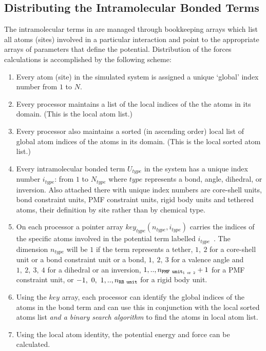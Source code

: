 \subsection{Distributing the Intramolecular Bonded Terms}

The intramolecular
terms in \D are managed through bookkeeping arrays which
list all atoms (sites) involved in a particular interaction
and point to the appropriate arrays of parameters that define
the potential.  Distribution of the forces calculations
is accomplished by the following scheme:
\begin{enumerate}
\item Every atom (site) in the simulated system is assigned a
unique `global' index number from $1$ to $N$.
\item Every processor maintains a list of the local indices of
the the atoms in its domain.  (This is the local atom list.)
\item Every processor also maintains a sorted (in ascending order)
local list of global atom indices of the atoms in its domain.
(This is the local sorted atom list.)
\item Every intramolecular bonded term $U_{type}$ in the system has a unique index
number $i_{type}$: from $1$ to $N_{type}$ where $type$ represents a
bond, angle,
dihedral, or inversion.
Also attached there with unique index numbers are
core-shell units,
bond constraint units,
PMF constraint units,
rigid body units and
tethered atoms,
their definition by site rather than by chemical type.
\item On each processor a pointer array
$key_{type}(n_{type},i_{type})$ carries the indices of the
specific atoms involved in the potential term labelled
$i_{type}$~.  The dimension $n_{type}$ will be $1$ if the
term represents a tether, $1,~2$
for a core-shell unit or
a bond constraint unit or a
bond, $1,~2,~3$ for a valence
angle and $1,~2,~3,~4$ for a
dihedral or an
inversion, $1,..,n_{\tt PMF~unit_{1~or~2}}+1$
for a PMF constraint unit, or
$-1,~0,~1,..,n_{\tt RB~unit}$ for a rigid body unit.
\item Using the $key$ array, each processor can identify the global
indices of the atoms in the bond term and can use this in
conjunction with the local sorted atoms list {\em and a binary
search algorithm} to find the atoms in local atom list.
\item Using the local atom identity, the potential energy and force
can be calculated.
\end{enumerate}

